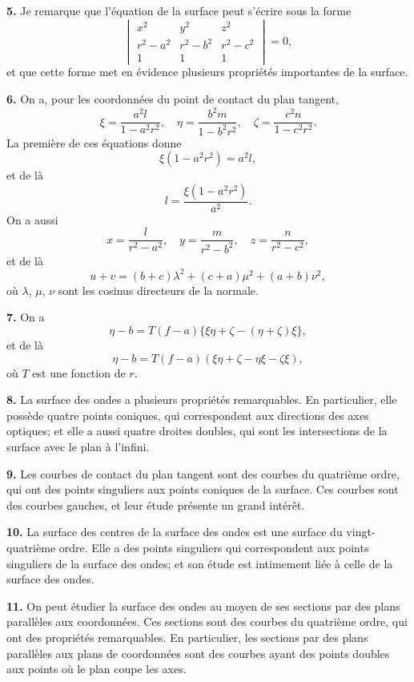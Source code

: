 \documentclass[11pt,a4paper]{book}
\begin{document}
\textbf{5.} Je remarque que l'\'equation de la surface peut s'\'ecrire sous la forme
\[
\begin{vmatrix}
x^2 & y^2 & z^2 \\
r^2-a^2 & r^2-b^2 & r^2-c^2 \\
1 & 1 & 1
\end{vmatrix} = 0,
\]
et que cette forme met en \'evidence plusieurs propri\'et\'es importantes de la surface.

\textbf{6.} On a, pour les coordonn\'ees du point de contact du plan tangent,
\[
\xi = \frac{a^2l}{1-a^2r^2}, \quad \eta = \frac{b^2m}{1-b^2r^2}, \quad \zeta = \frac{c^2n}{1-c^2r^2}.
\]
La premi\`ere de ces \'equations donne
\[
\xi(1-a^2r^2) = a^2l,
\]
et de l\`a
\[
l = \frac{\xi(1-a^2r^2)}{a^2}.
\]
On a aussi
\[
x = \frac{l}{r^2-a^2}, \quad y = \frac{m}{r^2-b^2}, \quad z = \frac{n}{r^2-c^2},
\]
et de l\`a
\[
u + v = (b+c)\lambda^2 + (c+a)\mu^2 + (a+b)\nu^2,
\]
o\`u $\lambda$, $\mu$, $\nu$ sont les cosinus directeurs de la normale.

\newpage
\textbf{7.} On a
\[
\eta - b = T(f-a)\{\xi\eta + \zeta - (\eta + \zeta)\xi\},
\]
et de l\`a
\[
\eta - b = T(f-a)(\xi\eta + \zeta - \eta\xi - \zeta\xi),
\]
o\`u $T$ est une fonction de $r$.

\textbf{8.} La surface des ondes a plusieurs propri\'et\'es remarquables. En
particulier, elle poss\`ede quatre points coniques, qui correspondent aux directions
des axes optiques; et elle a aussi quatre droites doubles, qui sont les intersections
de la surface avec le plan \`a l'infini.

\textbf{9.} Les courbes de contact du plan tangent sont des courbes du quatri\`eme
ordre, qui ont des points singuliers aux points coniques de la surface. Ces courbes
sont des courbes gauches, et leur \'etude pr\'esente un grand int\'er\^et.

\textbf{10.} La surface des centres de la surface des ondes est une surface du
vingt-quatri\`eme ordre. Elle a des points singuliers qui correspondent aux points
singuliers de la surface des ondes; et son \'etude est intimement li\'ee \`a celle de la
surface des ondes.

\textbf{11.} On peut \'etudier la surface des ondes au moyen de ses sections par
des plans parall\`eles aux coordonn\'ees. Ces sections sont des courbes du quatri\`eme
ordre, qui ont des propri\'et\'es remarquables. En particulier, les sections par des
plans parall\`eles aux plans de coordonn\'ees sont des courbes ayant des points doubles
aux points o\`u le plan coupe les axes.
\end{document}

